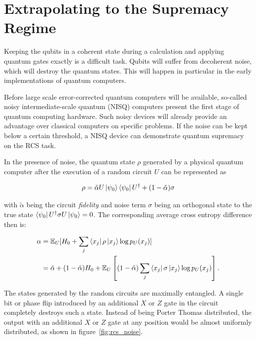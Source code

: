 \section{Extrapolating to the Supremacy Regime}

Keeping the qubits in a coherent state during a calculation and applying quantum
gates exactly is a difficult task. Qubits will suffer from decoherent noise, which will destroy the quantum states. This will happen in particular in the early implementations of quantum computers.

Before large scale error-corrected quantum computers will be available, so-called noisy intermediate-scale quantum (NISQ) computers present the first stage
of quantum computing hardware. Such noisy devices will already provide an
advantage over classical computers on specific problems. If the noise can be
kept below a certain threshold, a NISQ device can demonstrate quantum
supremacy on the RCS task.

In the presence of noise, the quantum state $\rho$ generated by a physical quantum computer
after the execution of a random circuit $U$ can be represented as

\begin{equation}
  \rho = \tilde{\alpha} U \Ket{\psi_0} \Bra{\psi_0} U^{\dagger} + (1- \tilde{\alpha}) \sigma
\end{equation}

with $\tilde{\alpha}$ being the circuit \textit{fidelity} and noise term $\sigma$ being an orthogonal state to the true state
$\Bra{\psi_0}U^{\dagger}\sigma U \Ket{\psi_0} = 0$.
The corresponding average cross entropy difference then is:

\begin{align}
  \alpha &= \mathbb{E}_U[H_0+ \sum_j \Bra{x_j} \rho \Ket{x_j} \log{p_U(x_j)} ] \\
         &= \tilde{\alpha} + (1-\tilde{\alpha})H_0 + \mathbb{E}_U\left[(1-\tilde{\alpha}) \sum_j \Bra{x_j} \sigma \Ket{x_j} \log{p_U(x_j)}\right].
\end{align}

The states generated by the random circuits are
maximally entangled. A single bit or phase flip introduced by an additional $ X $ or $ Z $ gate in the circuit completely destroys such a state. Instead of being Porter Thomas distributed, the output with an additional $X$ or $Z$ gate at any position would be almost uniformly distributed, as shown in figure~\ref{fig:rcs_noise}.

